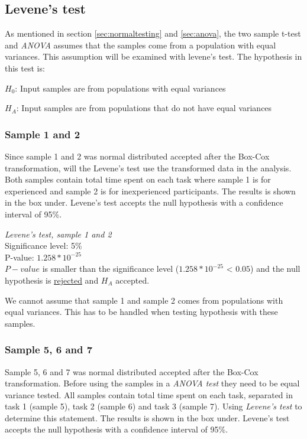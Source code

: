 \subsection{Levene's test}
As mentioned in section \ref{sec:normaltesting} and \ref{sec:anova}, the two sample t-test and \textit{ANOVA} assumes that the samples come from a population with equal variances. This assumption will be examined with levene's test. The hypothesis in this test is: \\[0.5cm]

\centerline{$H_{0}$: Input samples are from populations with equal variances} 
\centerline{$H_{A}$: Input samples are from populations that do not have equal variances}

\subsubsection[Sample 1 and 2]{Sample 1 and 2}\label{sec:sample1,2}
Since sample 1 and 2 was normal distributed accepted after the Box-Cox transformation, will the Levene's test use the transformed data in the analysis. Both samples contain total time spent on each task where sample 1 is for experienced and sample 2 is for inexperienced participants. The results is shown in the box under. Levene's test accepts the null hypothesis with a confidence interval of 95\%.

 \begin{center}
	\begin{tcolorbox}[box align=center,width=\textwidth-5cm]
		\centering
		\textit{Levene's test, sample 1 and 2}\\
		Significance level: 5\%  \\[0.5cm]
		
		P-value: $1.258 * 10^{-25}$\\[0.2cm]
		
		$P-value$ is smaller than the significance level ($1.258*10^{-25}$ < $0.05$) and the null hypothesis is \underline{rejected} and $H_A$ accepted.\\[0.5cm]
	\end{tcolorbox} 
\end{center}

We cannot assume that sample 1 and sample 2 comes from populations with equal variances. This has to be handled when testing hypothesis with these samples.

\subsubsection{Sample 5, 6 and 7}\label{sec:sample5,6,7}
Sample 5, 6 and 7 was normal distributed accepted after the Box-Cox transformation. Before using the samples in a \textit{ANOVA test} they need to be equal variance tested. All samples contain total time spent on each task, separated in task 1 (sample 5), task 2 (sample 6) and task 3 (sample 7). Using \textit{Levene's test} to determine this statement. The results is shown in the box under. Levene's test accepts the null hypothesis with a confidence interval of 95\%.

